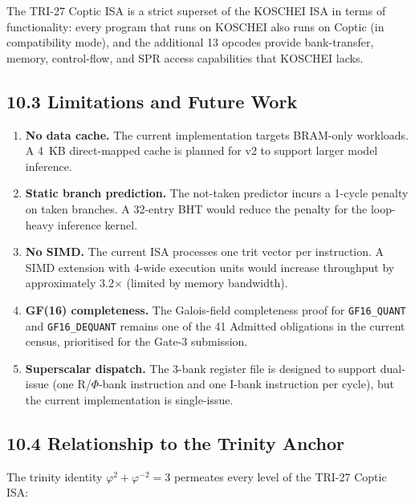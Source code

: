The TRI-27 Coptic ISA is a strict superset of the KOSCHEI ISA
in terms of functionality: every program that runs on KOSCHEI
also runs on Coptic (in compatibility mode), and the additional
13 opcodes provide bank-transfer, memory, control-flow, and SPR
access capabilities that KOSCHEI lacks.

\subsection{10.3 Limitations and Future Work}\label{fa_71:limitations}

\begin{enumerate}
\def\labelenumi{\arabic{enumi}.}
\item
  \textbf{No data cache.} The current implementation targets
  BRAM-only workloads. A 4~KB direct-mapped cache is planned
  for v2 to support larger model inference.
\item
  \textbf{Static branch prediction.} The not-taken predictor
  incurs a 1-cycle penalty on taken branches. A 32-entry BHT
  would reduce the penalty for the loop-heavy inference kernel.
\item
  \textbf{No SIMD.} The current ISA processes one trit vector
  per instruction. A SIMD extension with 4-wide execution units
  would increase throughput by approximately 3.2$\times$ (limited
  by memory bandwidth).
\item
  \textbf{GF(16) completeness.} The Galois-field completeness
  proof for \texttt{GF16\_QUANT} and \texttt{GF16\_DEQUANT}
  remains one of the 41 Admitted obligations in the current
  census, prioritised for the Gate-3 submission.
\item
  \textbf{Superscalar dispatch.} The 3-bank register file is
  designed to support dual-issue (one R/$\Phi$-bank instruction
  and one I-bank instruction per cycle), but the current
  implementation is single-issue.
\end{enumerate}

\subsection{10.4 Relationship to the Trinity Anchor}\label{fa_71:anchor}

The trinity identity \(\varphi^2 + \varphi^{-2} = 3\) permeates
every level of the TRI-27 Coptic ISA:

